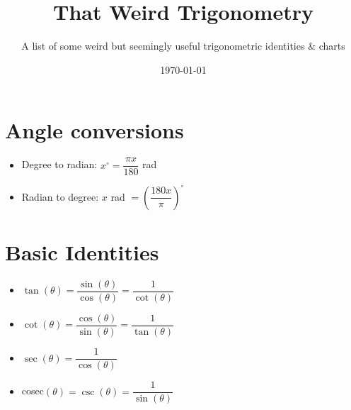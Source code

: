 \documentclass{article}
\title{That Weird Trigonometry}
\author{A list of some weird but seemingly useful trigonometric identities \& charts}
\date{\today}
\begin{document}
\maketitle
\section{Angle conversions}
\begin{itemize}
	\item Degree to radian: $x^\circ = \dfrac{\pi x}{180}$ rad
	\item Radian to degree: $x$ rad $ = \left(\dfrac{180x}{\pi}\right)^\circ$
\end{itemize}

\maketitle
\section{Basic Identities}
\begin{itemize}
\item $\tan(\theta)=\dfrac{\sin(\theta)}{\cos(\theta)}=\dfrac{1}{\cot(\theta)}$
\item $\cot(\theta)=\dfrac{\cos(\theta)}{\sin(\theta)}=\dfrac{1}{\tan(\theta)}$
\item $\sec(\theta)=\dfrac{1}{\cos(\theta)}$
\item cosec$(\theta) = \csc(\theta)=\dfrac{1}{\sin(\theta)}$

\end{itemize}

\maketitle
\end{document}
